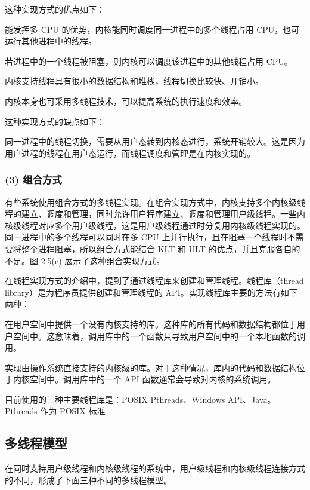 \documentclass{ctexbook}
\begin{document}
	这种实现方式的优点如下：
	
能发挥多 CPU 的优势，内核能同时调度同一进程中的多个线程占用 CPU，也可运行其他进程中的线程。

若进程中的一个线程被阻塞，则内核可以调度该进程中的其他线程占用 CPU。

内核支持线程具有很小的数据结构和堆栈，线程切换比较快、开销小。

内核本身也可采用多线程技术，可以提高系统的执行速度和效率。
	
	这种实现方式的缺点如下：
	
同一进程中的线程切换，需要从用户态转到内核态进行，系统开销较大。这是因为用户进程的线程在用户态运行，而线程调度和管理是在内核实现的。
	
	\subsubsection{(3) 组合方式}
	
	有些系统使用组合方式的多线程实现。在组合实现方式中，内核支持多个内核级线程的建立、调度和管理，同时允许用户程序建立、调度和管理用户级线程。一些内核级线程对应多个用户级线程，这是用户级线程通过时分复用内核级线程实现的。同一进程中的多个线程可以同时在多 CPU 上并行执行，且在阻塞一个线程时不需要将整个进程阻塞，所以组合方式能结合 KLT 和 ULT 的优点，并且克服各自的不足。图 2.5(c) 展示了这种组合实现方式。
	
	在线程实现方式的介绍中，提到了通过线程库来创建和管理线程。线程库（thread library）是为程序员提供创建和管理线程的 API。实现线程库主要的方法有如下两种：
	
在用户空间中提供一个没有内核支持的库。这种库的所有代码和数据结构都位于用户空间中。这意味着，调用库中的一个函数只导致用户空间中的一个本地函数的调用。

实现由操作系统直接支持的内核级的库。对于这种情况，库内的代码和数据结构位于内核空间中。调用库中的一个 API 函数通常会导致对内核的系统调用。
	
	目前使用的三种主要线程库是：POSIX Pthreads、Windows API、Java。Pthreads 作为 POSIX 标准
	
	\subsection{多线程模型}
	
	在同时支持用户级线程和内核级线程的系统中，用户级线程和内核级线程连接方式的不同，形成了下面三种不同的多线程模型。
	
\end{document}
